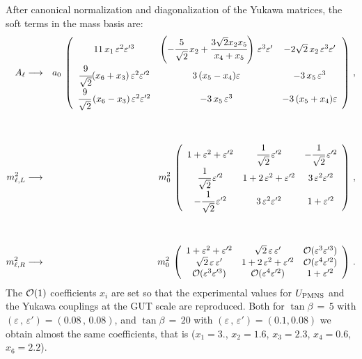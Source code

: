\documentclass[a4paper,11pt]{article}
\newcommand{\bea}{\begin{eqnarray}}
\newcommand{\eea}{\end{eqnarray}}
\newcommand{\vep}{\varepsilon}
\newcommand{\nn}{\nonumber}
\begin{document}
After canonical normalization and diagonalization of the Yukawa matrices, the soft terms in the mass basis are:
\bea
A_\ell & \longrightarrow & a_{0}\: \left(\begin{array}{ccc}
            11\,x_1\,\vep^2\vep'^3 & \left(-\cfrac{5}{\sqrt{2}}\,x_2+\cfrac{3\sqrt{2}x_2x_5}{x_4+x_5}\right)\,\vep^3\vep' & -2\sqrt{2}\,x_2\,\vep^3\vep' \\
             \cfrac{9}{\sqrt{2}}(x_6+x_3)\,\vep^2\vep'^2 & 3\,(x_5-x_4)\vep & -3\,x_5\,\vep^3 \\
             \cfrac{9}{\sqrt{2}}\,(x_6-x_3)\,\vep^2\vep'^2 & -3\,x_5\,\vep^3 & -3\,(x_5+x_4)\vep  
               \end{array} \right)    \,,\\ 
\nn \\ 
\nn \\             
m_{\ell,L}^2 & \longrightarrow & m_{0}^2\: \left(\begin{array}{ccc}
            1+\vep^2+\vep'^2       & \cfrac{1}{\sqrt{2}}\,\vep'^2 & -\cfrac{1}{\sqrt{2}}\,\vep'^2 \\
         \cfrac{1}{\sqrt{2}}\,\vep'^2 & 1+2\,\vep^2+\vep'^2           & 3\,\vep^2\vep'^2  \\
        -\cfrac{1}{\sqrt{2}}\,\vep'^2 & 3\,\vep^2\vep'^2            & 1+\vep'^2
               \end{array} \right)    \,,\\   
\nn \\    
\nn \\         
m_{\ell,R}^2 & \longrightarrow & m_{0}^2\: \left(\begin{array}{ccc}
         1+\vep^2+\vep'^2 & \sqrt{2}\,\vep\,\vep'    & {\cal O}(\vep^3\vep'^3)  \\
     \sqrt{2}\,\vep\,\vep'  & 1+2\,\vep^2+\vep'^2        & {\cal O}(\vep^4\vep'^2)  \\
    {\cal O}(\vep^3\vep'^3) &  {\cal O}(\vep^4\vep'^2) & 1+\vep'^2
               \end{array} \right)    \,.
\eea
The ${\cal O}(1)$ coefficients $x_i$ are set so that the experimental values for $U_{\rm PMNS}$ \cite{Patrignani:2016xqp} and the Yukawa couplings at the GUT scale \cite{Antusch:2013jca} are reproduced. Both for $\tan\beta \,=\,5$ with $(\vep\,,\,\vep')=(0.08\,,\,0.08)$, and $\tan\beta \,=\,20$ with $(\vep\,,\,\vep')=(0.1,0.08)$ we obtain almost the same coefficients, that is ($x_1=3.$, $x_2=1.6$, $x_3=2.3$, $x_4=0.6$, $x_6=2.2$).
\end{document}

